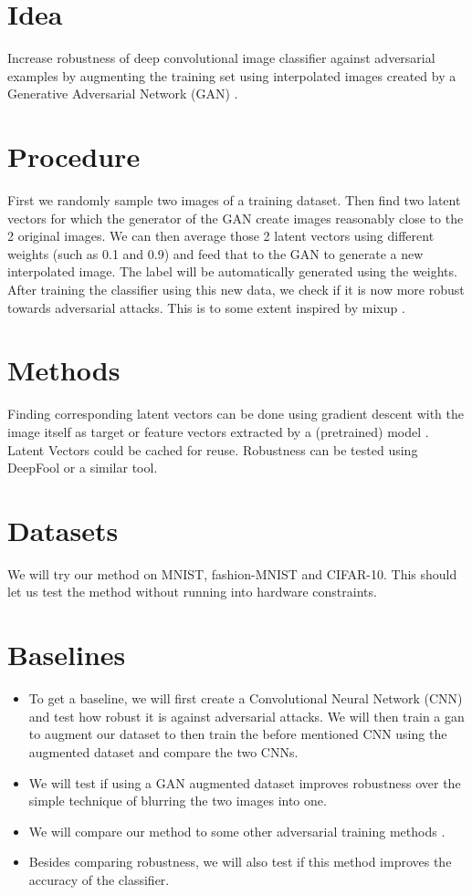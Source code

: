 \documentclass{article}
\begin{document}
	\section{Idea}
	Increase robustness of deep convolutional image classifier against adversarial examples \cite{advExamples} by augmenting the training set using interpolated images created by a Generative Adversarial Network (GAN) \cite{gan}.
	
	\section{Procedure}
	First we randomly sample two images of a training dataset. Then find two latent vectors for which the generator of the GAN create images reasonably close to the 2 original images. We can then average those 2 latent vectors using different weights (such as 0.1 and 0.9) and feed that to the GAN to generate a new interpolated image. The label will be automatically generated using the weights. After training the classifier using this new data, we check if it is now more robust towards adversarial attacks. This is to some extent inspired by mixup \cite{mixup2}\cite{mixup1}.  
	
	\section{Methods}
	Finding corresponding latent vectors can be done using gradient descent with the image itself as target \cite{latentVector} or feature vectors extracted by a (pretrained) model \cite{ytLatentVector}. Latent Vectors could be cached for reuse.
	Robustness can be tested using DeepFool \cite{deepFool} or a similar tool.
	
	\section{Datasets}
	We will try our method on MNIST, fashion-MNIST and CIFAR-10. This should let us test the method without running into hardware constraints.
	
	\section{Baselines}
	\begin{itemize}
		\item To get a baseline, we will first create a Convolutional Neural Network (CNN) and test how robust it is against adversarial attacks. We will then train a gan to augment our dataset to then train the before mentioned CNN using the augmented dataset and compare the two CNNs.
		\item We will test if using a GAN augmented dataset improves robustness over the simple technique of blurring the two images into one.
		\item We will compare our method to some other adversarial training methods \cite{adv}\cite{gat}.
		\item Besides comparing robustness, we will also test if this method improves the accuracy of the classifier.
	\end{itemize}
	
	
	
\end{document}

